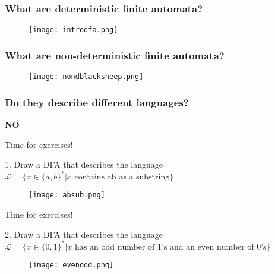 \documentclass{beamer}
\begin{document}
\begin{frame}
	\frametitle{What are deterministic finite automata?}

	\begin{figure}
		\texttt{[image: introdfa.png]}
	\end{figure}	
\end{frame}


\begin{frame}
	\frametitle{What are non-deterministic finite automata?}
	
	\begin{figure}
		\texttt{[image: nondblacksheep.png]}
	\end{figure}

\end{frame}

\begin{frame}
	\frametitle{Do they describe different languages?}
\centering \large{\textbf{NO}}

\end{frame}


\begin{frame}

Time for exercises!

\vspace{0.2in}

1. Draw a DFA that describes the language $\mathcal{L} = \{ x \in \{a, b\}^* | x \text{ contains ab as a substring} \}$

\pause

\begin{figure}
\texttt{[image: absub.png]}
\end{figure}

\end{frame}


\begin{frame}

Time for exercises!

\vspace{0.2in}

2. Draw a DFA that describes the language $\mathcal{L} = \{ x \in \{0,1\}^* | x \text{ has an odd number of 1's and an even number of 0's} \}$

\pause

\begin{figure}
\texttt{[image: evenodd.png]}
\end{figure}

\end{frame}
\end{document}
